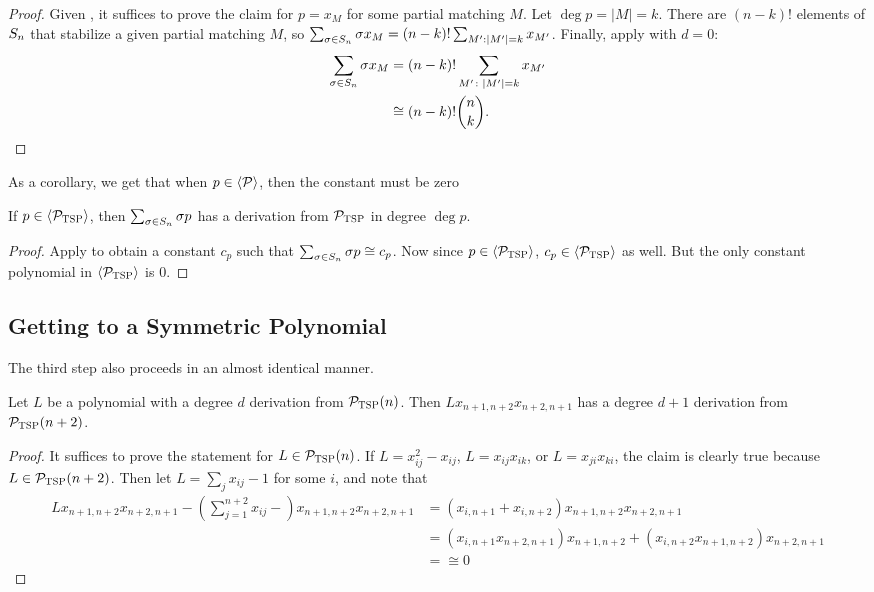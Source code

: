 \begin{proof}
Given ,
it suffices to prove the claim for
\(p = x_{M}\) for some partial matching \(M\).
Let $\deg p = |M| = k$.
There are $(n-k)!$ elements of $S_{n}$ that stabilize a given partial matching $M$, so
$\sum_{\sigma \in S_{n}} \sigma x_M = (n-k)!\sum_{M': |M'| = k} x_{M'}$.
Finally, apply  with $d = 0$:
\begin{equation*}
  \begin{split}
  \sum_{\sigma \in S_{n}} \sigma x_{M}
  &= (n-k)! \sum_{M' \colon \left|M'\right| = k} x_{M'} \\
  &\cong
  (n-k)!\binom{n}{k}.
  \end{split}
\end{equation*}
\end{proof}
As a corollary, we get that when $p \in \langle \mathcal P \rangle$, then the constant must be zero 
\begin{corollary}\label{cor:tsp-constantiszero}
If $p \in \langle \mathcal P_{\textsc{TSP}} \rangle$, then $\sum_{\sigma \in S_{n}} \sigma p$ has a derivation from $\mathcal P_{\textsc{TSP}}$ in degree $\deg p$.
\end{corollary}
\begin{proof}
Apply  to obtain a constant $c_p$ such that $\sum_{\sigma \in S_{n}} \sigma p \cong c_p$. 
Now since $p \in \langle \mathcal P_{\textsc{TSP}} \rangle$, $c_p \in \langle \mathcal P_{\textsc{TSP}} \rangle$ as well. But the only constant polynomial in $\langle \mathcal P_{\textsc{TSP}} \rangle$ is $0$.
\end{proof}

\subsection{Getting to a Symmetric Polynomial}
The third step also proceeds in an almost identical manner.
\begin{lemma}
  \label{lem:tsp-degree-increase}
  Let \(L\) be a polynomial with a degree $d$ derivation from $\mathcal P_{\textsc{TSP}}(n)$.
	Then $Lx_{n+1,n+2}x_{n+2,n+1}$ has a degree $d+1$ derivation from $\mathcal P_{\textsc{TSP}}(n+2)$.
\end{lemma}
\begin{proof}
It suffices to prove the statement for $L \in \mathcal P_{\textsc{TSP}}(n)$. 
If $L = x_{ij}^2 - x_{ij}$, $L = x_{ij}x_{ik}$, or $L = x_{ji}x_{ki}$, the claim is clearly true because $L \in \mathcal P_{\textsc{TSP}}(n+2)$.
Then let $L = \sum_j x_{ij} - 1$ for some $i$, and note that 
\begin{align*}
Lx_{n+1,n+2}x_{n+2,n+1} - \left(\sum_{j=1}^{n+2} x_{ij} - \right)x_{n+1,n+2}x_{n+2,n+1} &= \left(x_{i,n+1} + x_{i,n+2}\right)x_{n+1,n+2}x_{n+2,n+1} \\
&= \left(x_{i,n+1}x_{n+2,n+1}\right)x_{n+1,n+2} + \left(x_{i,n+2}x_{n+1,n+2}\right)x_{n+2,n+1} \\
&= \cong 0
\end{align*}
\end{proof}

